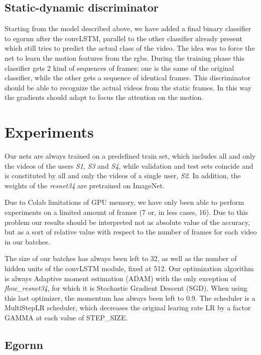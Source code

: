 \documentclass[10pt,twocolumn,hidelinks,letterpaper]{article}
\begin{document}
\subsection{Static-dynamic discriminator}

Starting from the model described above, we have added a final binary classifier to egornn after the convLSTM, parallel to the other classifier already present which still tries to predict the actual class of the video. The idea was to force the net to learn the motion features from the rgbs. During the training phase this classifier gets 2 kind of sequences of frames: one is the same of the original classifier, while the other gets a sequence of identical frames. This discriminator should be able to recognize the actual videos from the static frames. In this way the gradients should adapt to focus the attention on the motion.

\section{Experiments}

Our nets are always trained on a predefined train set, which includes all and only the videos of the users \textit{S1}, \textit{S3} and \textit{S4}, while validation and test sets coincide and is constituted by all and only the videos of a single user, \textit{S2}. In addition, the weights of the \textit{resnet34} are pretrained on ImageNet.

Due to Colab limitations of GPU memory, we have only been able to perform experiments on a limited amount of frames (7 or, in less cases, 16). Due to this problem our results should be interpreted not as absolute value of the accuracy, but as a sort of relative value with respect to the number of frames for each video in our batches.

The size of our batches has always been left to 32, as well as the number of hidden units of the convLSTM module, fixed at 512. Our optimization algorithm is always Adaptive moment estimation (ADAM) with the only exception of \textit{flow\_resnet34}, for which it is Stochastic Gradient Descent (SGD). When using this last optimizer, the momentum has always been left to 0.9. The scheduler is a MultiStepLR scheduler, which decreases the original learing rate LR by a factor GAMMA at each value of STEP\_SIZE.

\subsection{Egornn}
\end{document}
